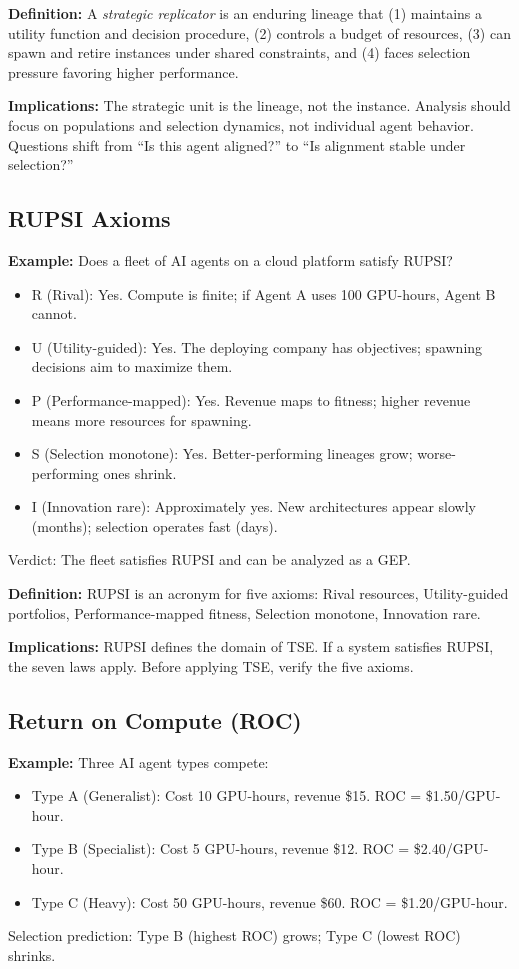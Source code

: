 \documentclass[12pt]{article}
\begin{document}
\textbf{Definition:} A \emph{strategic replicator} is an enduring lineage that (1) maintains a utility function and decision procedure, (2) controls a budget of resources, (3) can spawn and retire instances under shared constraints, and (4) faces selection pressure favoring higher performance.

\textbf{Implications:} The strategic unit is the lineage, not the instance. Analysis should focus on populations and selection dynamics, not individual agent behavior. Questions shift from ``Is this agent aligned?'' to ``Is alignment stable under selection?''

\subsection{RUPSI Axioms}

\textbf{Example:} Does a fleet of AI agents on a cloud platform satisfy RUPSI?
\begin{itemize}[nosep]
\item R (Rival): Yes. Compute is finite; if Agent A uses 100 GPU-hours, Agent B cannot.
\item U (Utility-guided): Yes. The deploying company has objectives; spawning decisions aim to maximize them.
\item P (Performance-mapped): Yes. Revenue maps to fitness; higher revenue means more resources for spawning.
\item S (Selection monotone): Yes. Better-performing lineages grow; worse-performing ones shrink.
\item I (Innovation rare): Approximately yes. New architectures appear slowly (months); selection operates fast (days).
\end{itemize}
Verdict: The fleet satisfies RUPSI and can be analyzed as a GEP.

\textbf{Definition:} RUPSI is an acronym for five axioms: Rival resources, Utility-guided portfolios, Performance-mapped fitness, Selection monotone, Innovation rare.

\textbf{Implications:} RUPSI defines the domain of TSE. If a system satisfies RUPSI, the seven laws apply. Before applying TSE, verify the five axioms.

\subsection{Return on Compute (ROC)}

\textbf{Example:} Three AI agent types compete:
\begin{itemize}[nosep]
\item Type A (Generalist): Cost 10 GPU-hours, revenue \$15. ROC = \$1.50/GPU-hour.
\item Type B (Specialist): Cost 5 GPU-hours, revenue \$12. ROC = \$2.40/GPU-hour.
\item Type C (Heavy): Cost 50 GPU-hours, revenue \$60. ROC = \$1.20/GPU-hour.
\end{itemize}
Selection prediction: Type B (highest ROC) grows; Type C (lowest ROC) shrinks.
\end{document}
